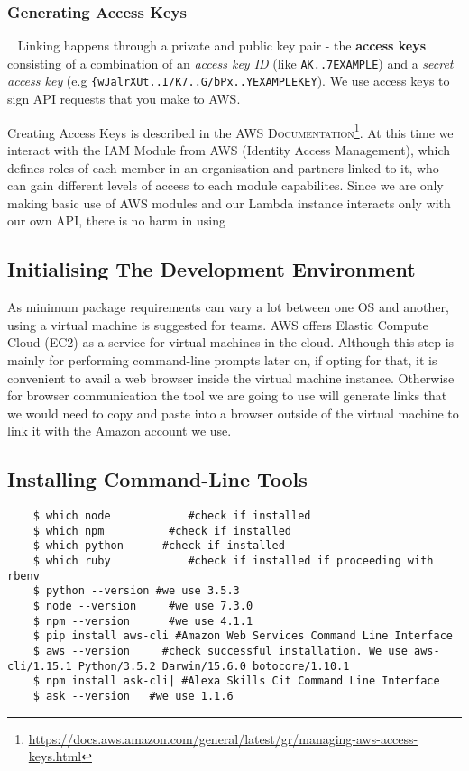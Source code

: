 \subsubsection*{Generating Access Keys}~\label{accesskeys}
Linking happens through a private and public key pair - the \textbf{access keys} consisting of a
combination of an \textit{access key ID} (like \lstinline|AK..7EXAMPLE|) and a \textit{secret access key} (e.g \lstinline|{wJalrXUt..I/K7..G/bPx..YEXAMPLEKEY|). We use access keys to sign API requests that you make to AWS.

Creating Access Keys is described in the \textsc{AWS Documentation}\footnote{\url{https://docs.aws.amazon.com/general/latest/gr/managing-aws-access-keys.html}}. At this time we interact with the IAM Module from AWS (Identity Access Management), which defines roles of each member in an organisation and partners linked to it, who can gain different levels of access to each module capabilites. Since we are only making basic use of AWS modules and our Lambda instance interacts only with our own API, there is no harm in using 


\subsection*{Initialising The Development Environment}

As minimum package requirements can vary a lot between one OS and another, using a virtual machine is suggested for teams. AWS offers Elastic Compute Cloud (EC2) as a service for virtual machines in the cloud. Although this step is mainly for performing command-line prompts later on, if opting for that, it is convenient to avail a web browser inside the virtual machine instance. Otherwise for browser communication the tool we are going to use will generate links that we would need to copy and paste into a browser outside of the virtual machine to link it with the Amazon account we use.


\subsection*{Installing Command-Line Tools}

\begin{verbatim}
	$ which node			#check if installed
	$ which npm			 #check if installed
	$ which python		#check if installed
	$ which ruby			#check if installed if proceeding with rbenv
	$ python --version #we use 3.5.3
	$ node --version	 #we use 7.3.0
	$ npm --version 	 #we use 4.1.1
	$ pip install aws-cli #Amazon Web Services Command Line Interface
	$ aws --version		#check successful installation. We use aws-cli/1.15.1 Python/3.5.2 Darwin/15.6.0 botocore/1.10.1
	$ npm install ask-cli| #Alexa Skills Cit Command Line Interface
	$ ask --version	  #we use 1.1.6
\end{verbatim}




